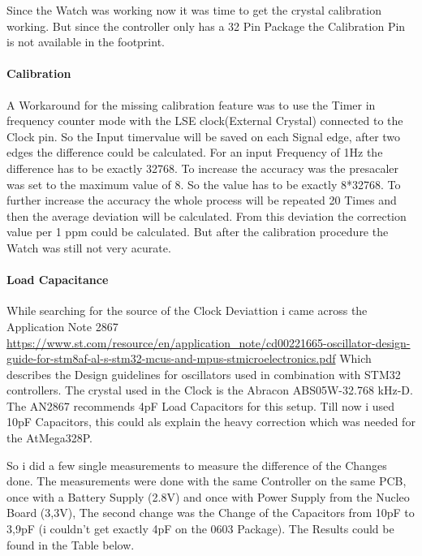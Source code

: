 Since the Watch was working now it was time to get the crystal calibration working. But since the controller only has a 32 Pin Package the Calibration Pin is not available in the footprint. 

\paragraph{Calibration}
A Workaround for the missing calibration feature was to use the Timer in frequency counter mode with the LSE clock(External Crystal) connected to the Clock pin. So the Input timervalue will be saved on each Signal edge, after two edges the difference could be calculated. For an input Frequency of 1Hz the difference has to be exactly 32768. To increase the accuracy was the presacaler was set to the maximum value of 8. So the value has to be exactly 8*32768. To further increase the accuracy the whole process will be repeated 20 Times and then the average deviation will be calculated. From this deviation the correction value per 1 ppm could be calculated. But after the calibration procedure the Watch was still not very acurate.

\paragraph{Load Capacitance}
While searching for the source of the Clock Deviattion i came across the Application Note 2867
\url{https://www.st.com/resource/en/application_note/cd00221665-oscillator-design-guide-for-stm8af-al-s-stm32-mcus-and-mpus-stmicroelectronics.pdf} Which describes the Design guidelines for oscillators used in combination with STM32 controllers. The crystal used in the Clock is the Abracon ABS05W-32.768 kHz-D. The AN2867 recommends 4pF Load Capacitors for this setup. Till now i used 10pF Capacitors, this could als explain the heavy correction which was needed for the AtMega328P.

So i did a few single measurements to measure the difference of the Changes done. The measurements were done with the same Controller on the same PCB, once with a Battery Supply (2.8V) and once with Power Supply from the Nucleo Board (3,3V), The second change was the Change of the Capacitors from 10pF to 3,9pF (i couldn't get exactly 4pF on the 0603 Package). The Results could be found in the Table below.
\vspace{1cm}

